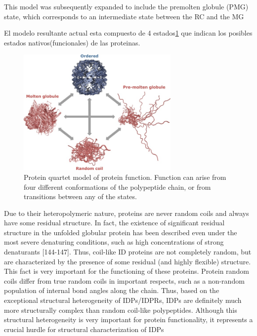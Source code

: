 This model was subsequently expanded to include the premolten globule (PMG) state, which corresponds to an intermediate state between the RC and the MG

El modelo resultante actual esta compuesto de 4 estados\ref{proteinQuartet} que indican los posibles estados nativos(funcionales) de las proteinas.



\begin{figure}[htbp]
\centering
\includegraphics[width=0.7\textwidth]{img/proteinQuartet.jpg} 
\caption{Protein quartet model of protein function. Function can arise
from four different conformations of the polypeptide chain, or from
transitions between any of the states. \cite{uversky2002natively}}
\label{proteinQuartet}
\end{figure}





Due to their heteropolymeric nature, proteins are never random coils and always have some residual structure.
In fact, the existence of significant residual structure in the unfolded globular protein has been described even under the most
severe denaturing conditions, such as high concentrations of strong denaturants [144-147]. Thus, coil-like ID proteins are not completely random, but are characterized by the presence
of some residual (and highly flexible) structure. This fact is very important for the functioning of these proteins.
Protein random coils differ from true random coils in important respects, such as a non-random population of internal bond angles along the chain.
Thus, based on the exceptional structural heterogeneity of IDPs/IDPRs, IDPs are definitely much more structurally complex than random coil-like polypeptides.
Although this structural heterogeneity is very important for protein functionality, it represents a crucial hurdle for structural characterization of IDPs

